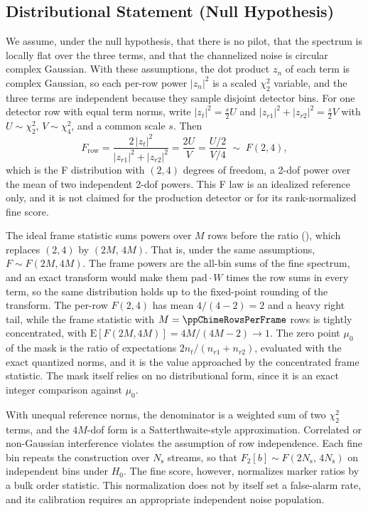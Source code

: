 \documentclass[10pt,letterpaper]{article}
\newcommand{\code}[1]{\texttt{\detokenize{#1}}}
\begin{document}
\subsection{Distributional Statement (Null Hypothesis)}
\label{ssec:dist}

We assume, under the null hypothesis, that there is no pilot, that the
spectrum is locally flat over the three terms, and that the channelized noise
is circular complex Gaussian. With these assumptions, the dot product \(z_n\)
of each term is complex Gaussian, so each per-row power \(|z_n|^2\) is a
scaled \(\chi^2_2\) variable, and the three terms are independent because they
sample disjoint detector bins. For one detector row with equal term norms,
write \(|z_t|^2 = \tfrac{s}{2}U\) and
\(|z_{r1}|^2+|z_{r2}|^2 = \tfrac{s}{2}V\) with \(U\sim\chi^2_2\),
\(V\sim\chi^2_4\), and a common scale \(s\). Then
\begin{equation}
F_{\mathrm{row}}
= \frac{2\,|z_t|^2}{|z_{r1}|^2+|z_{r2}|^2}
= \frac{2U}{V}
= \frac{U/2}{V/4}
\;\sim\; F(2,4),
\end{equation}
which is the F distribution with \((2,4)\) degrees of freedom, a 2-dof power
over the mean of two independent 2-dof powers. This F law is an idealized
reference only, and it is not claimed for the production detector or for its
rank-normalized fine score.

The ideal frame statistic sums powers over \(M\) rows before the ratio
(\code{all_rows_summed_before_ratio}), which replaces \((2,4)\) by
\((2M,\,4M)\). That is, under the same assumptions, \(F \sim F(2M, 4M)\). The
frame powers are the all-bin sums of the fine spectrum, and an exact transform
would make them \(\mathrm{pad}\cdot W\) times the row sums in every term, so
the same distribution holds up to the fixed-point rounding of the transform.
The per-row \(F(2,4)\) has mean \(4/(4-2)=2\) and a heavy right tail, while
the frame statistic with \(M=\ppChimeRowsPerFrame\) rows is tightly
concentrated, with \(\mathrm{E}[F(2M,4M)] = 4M/(4M-2) \to 1\). The zero point
\(\mu_0\) of the mask is the ratio of expectations \(2 n_t/(n_{r1}+n_{r2})\),
evaluated with the exact quantized norms, and it is the value approached by
the concentrated frame statistic. The mask itself relies on no distributional
form, since it is an exact integer comparison against \(\mu_0\).

With unequal reference norms, the denominator is a weighted sum of two
\(\chi^2_2\) terms, and the \(4M\)-dof form is a Satterthwaite-style
approximation. Correlated or non-Gaussian interference violates the
assumption of row independence. Each fine bin repeats the construction over
\(N_{\mathrm{s}}\) streams, so that
\(F_2[b] \sim F(2N_{\mathrm{s}},\,4N_{\mathrm{s}})\) on independent bins under
\(H_0\). The fine score, however, normalizes marker ratios by a bulk order
statistic. This normalization does not by itself set a false-alarm rate, and
its calibration requires an appropriate independent noise population.
\end{document}
